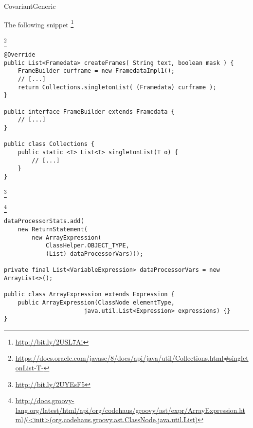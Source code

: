 \begin{pattern}{CovariantGeneric}

\instances{}
The following snippet%
\footnote{\url{http://bit.ly/2USL7Ai}}

\footnote{\url{https://docs.oracle.com/javase/8/docs/api/java/util/Collections.html\#singletonList-T-}}

\begin{verbatim}
@Override
public List<Framedata> createFrames( String text, boolean mask ) {
    FrameBuilder curframe = new FramedataImpl1();
    // [...]
    return Collections.singletonList( (Framedata) curframe );
}

public interface FrameBuilder extends Framedata {
    // [...]
}

public class Collections {
    public static <T> List<T> singletonList(T o) {
        // [...]
    }
}
\end{verbatim}

\footnote{\url{http://bit.ly/2UYEsF5}}

\footnote{\url{http://docs.groovy-lang.org/latest/html/api/org/codehaus/groovy/ast/expr/ArrayExpression.html\#<init>(org.codehaus.groovy.ast.ClassNode,java.util.List)}}

\begin{verbatim}
dataProcessorStats.add(
    new ReturnStatement(
        new ArrayExpression(
            ClassHelper.OBJECT_TYPE,
            (List) dataProcessorVars)));

private final List<VariableExpression> dataProcessorVars = new ArrayList<>();

public class ArrayExpression extends Expression {
    public ArrayExpression(ClassNode elementType,
                       java.util.List<Expression> expressions) {}
}
\end{verbatim}


\detection{}

\discussion{}

\related{}

\end{pattern}